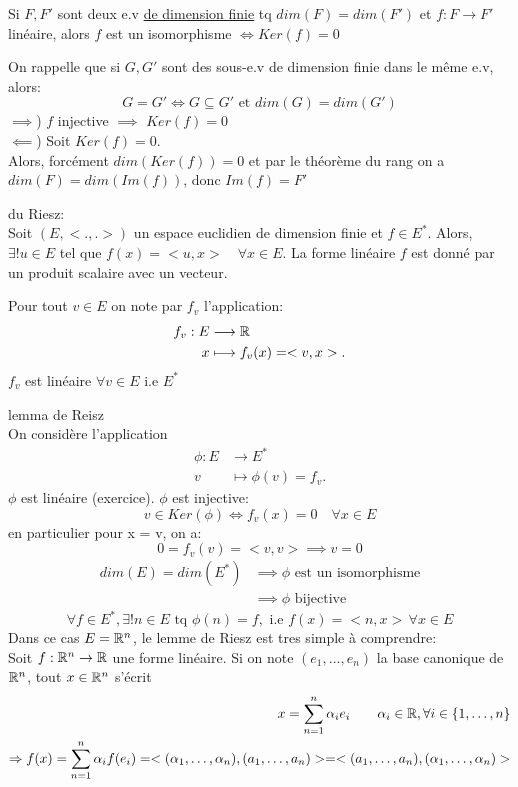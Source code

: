 \begin{prop}
    Si $F, F'$ sont deux e.v \underline{de dimension finie} tq $dim(F) = dim(F')$ et  $f: F \to F'$ linéaire, alors $f$ est un isomorphisme $\iff Ker(f) = {0}$
\end{prop}
\begin{explanation}
   On rappelle que si $G, G'$ sont des sous-e.v de dimension finie dans le même e.v, alors:
   \[
   G = G' \iff G \subseteq G' \text{ et } dim(G) = dim(G')
   \] 
   $\implies$) $f$ injective  $\implies$ $Ker(f) = {0}$\\
   $\impliedby$) Soit $Ker(f) = {0}$.\\
   Alors, forcément  $dim(Ker(f)) = 0$ et par le théorème du rang on a  $dim(F) = dim(Im(f))$, donc  $Im(f) = F'$
\end{explanation}
\begin{lemma} du Riesz:\\
    Soit $(E, <.,.>)$ un espace euclidien de  dimension finie et $f \in E^*$. Alors, $\exists! u \in E$ tel que $f(x) = <u, x> \quad \forall x \in E$. La forme linéaire $f$ est donné par un produit scalaire avec un vecteur. 
\end{lemma}
\begin{notation}
   Pour tout $v \in E$ on note par  $f_v$ l'application:
   \begin{align*}
       f_v: E &\longrightarrow \mathbb{R} \\
       x &\longmapsto f_v(x) = <v, x>
   .\end{align*}
   $f_v$ est linéaire  $\forall v \in E$ i.e $E^*$
\end{notation}
\begin{explanation} lemma de Reisz\\
   On considère l'application
   \begin{align*}
       \phi: E &\longrightarrow E^* \\
       v &\longmapsto \phi(v) = f_v
   .\end{align*}
   $\phi$ est linéaire (exercice).  $\phi$ est injective:
   \[
   v \in Ker(\phi) \iff f_v(x) = 0 \quad \forall x \in E
   \] 
   en particulier pour x = v, on a:
   \[
   0 = f_v(v) = <v,v> \implies v = 0
   \] 
   \begin{align*}
       dim(E) = dim(E^*) &\implies \phi \text{ est un isomorphisme}\\
                         &\implies \phi \text{ bijective}
   \end{align*}
   \[
   \forall f \in E^*, \exists! n \in E \text{ tq } \phi(n) = f, \text{ i.e } f(x) = <n, x> \, \forall x \in E
   \] 
   Dans ce cas $E = \mathbb{R}^n$, le lemme de Riesz est tres simple à comprendre:\\
   Soit  $f: \mathbb{R}^n \to \mathbb{R}$ une forme linéaire. Si on note $(e_1, \ldots, e_n)$ la base canonique de $\mathbb{R}^n$, tout $x \in \mathbb{R}^n$ s'écrit 
    \begin{align*}
        x = \sum_{n=1}^{n} \alpha_ie_i \qquad \alpha_i \in \mathbb{R}, \forall i \in \{1, \ldots, n\}\\
        \Rightarrow f(x) = \sum_{n=1}^{n} \alpha_if(e_i) = <(\alpha_1, \ldots, \alpha_n), (a_1, \ldots, a_n)> = <(a_1, \ldots, a_n), (\alpha_1, \ldots, \alpha_n)>
   \end{align*}
\end{explanation}
